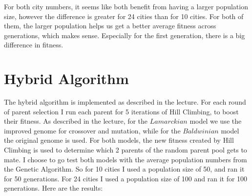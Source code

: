 \documentclass[a4paper, norsk, 12pt]{article}
\begin{document}
For both city numbers, it seems like both benefit from having a larger population size, however the difference is greater for 24 cities than for 10 cities. For both of them, the larger population helps us get a better average fitness across generations, which makes sense. Especially for the first generation, there is a big difference in fitness. 

\section{Hybrid Algorithm}

The hybrid algorithm is implemented as described in the lecture. For each round of parent selection I run each parent for 5 iterations of Hill Climbing, to boost their fitness. As described in the lecture, for the $Lamarckian$ model we use the improved genome for crossover and mutation, while for the $Baldwinian$ model the original genome is used. For both models, the new fitness created by Hill Climbing is used to determine which 2 parents of the random parent pool gets to mate. I choose to go test both models with the average population numbers from the Genetic Algorithm. So for 10 cities I used a population size of 50, and ran it for 50 generations. For 24 cities I used a population size of 100 and ran it for 100 generations. Here are the results:\newline\newline 
\end{document}
